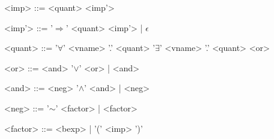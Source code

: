 \begin{grammar}
<imp> ::= <quant> <imp'>

<imp'> ::= '$\Rightarrow$' <quant> <imp'> | $\epsilon$

<quant> ::= '$\forall$' <vname> '.' <quant>
\alt '$\exists$' <vname> '.' <quant>
\alt <or>

<or> ::= <and> '$\vee$' <or> | <and>

<and> ::= <neg> '$\wedge$' <and> | <neg>

<neg> ::= '$\sim$' <factor> | <factor>

<factor> ::=  <bexp> | '(' <imp> ')'
\end{grammar}
